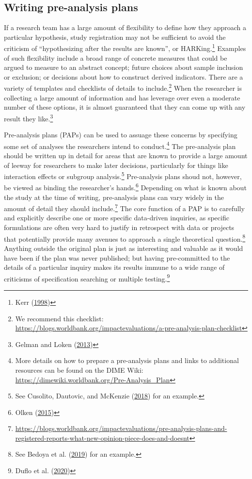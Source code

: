 \documentclass[
]{book}
\begin{document}
\hypertarget{writing-pre-analysis-plans}{%
\subsection*{Writing pre-analysis plans}\label{writing-pre-analysis-plans}}

If a research team has a large amount of flexibility
to define how they approach a particular hypothesis,
study registration may not be sufficient to avoid the criticism of
``hypothesizing after the results are known'', or HARKing.\footnote{Kerr (\protect\hyperlink{ref-kerr1998harking}{1998})}
Examples of such flexibility include a broad range
of concrete measures that could be argued to measure to an abstract concept;
future choices about sample inclusion or exclusion;
or decisions about how to construct derived indicators.
There are a variety of templates and checklists of details to include.\footnote{We recommend this checklist:
  \url{https://blogs.worldbank.org/impactevaluations/a-pre-analysis-plan-checklist}}
When the researcher is collecting a large amount of information
and has leverage over even a moderate number of these options,
it is almost guaranteed that they can come up with any result they like.\footnote{Gelman and Loken (\protect\hyperlink{ref-gelman2013garden}{2013})}

Pre-analysis plans (PAPs) can be used to assuage these concerns
by specifying some set of analyses the researchers intend to conduct.\footnote{More details on how to prepare a pre-analysis plans
  and links to additional resources
  can be found on the DIME Wiki:
  \url{https://dimewiki.worldbank.org/Pre-Analysis_Plan}}
The pre-analysis plan should be written up in detail
for areas that are known to provide a large amount of leeway
for researchers to make later decisions,
particularly for things like interaction effects or subgroup analysis.\footnote{See Cusolito, Dautovic, and McKenzie (\protect\hyperlink{ref-cusolito2018can}{2018}) for an example.}
Pre-analysis plans shoud not, however, be viewed as binding the researcher's hands.\footnote{Olken (\protect\hyperlink{ref-olken2015promises}{2015})}
Depending on what is known about the study at the time of writing,
pre-analysis plans can vary widely in the amount of detail they should include.\footnote{\url{https://blogs.worldbank.org/impactevaluations/pre-analysis-plans-and-registered-reports-what-new-opinion-piece-does-and-doesnt}}
The core function of a PAP is to carefully and explicitly describe
one or more specific data-driven inquiries,
as specific formulations are often very hard to justify in retrospect
with data or projects that potentially provide many avenues to approach
a single theoretical question.\footnote{See Bedoya et al. (\protect\hyperlink{ref-bedoya2019no}{2019}) for an example.}
Anything outside the original plan is just as interesting and valuable
as it would have been if the plan was never published;
but having pre-committed to the details of a particular inquiry makes its results
immune to a wide range of criticisms of specification searching or multiple testing.\footnote{Duflo et al. (\protect\hyperlink{ref-duflo2020praise}{2020})}
\end{document}
